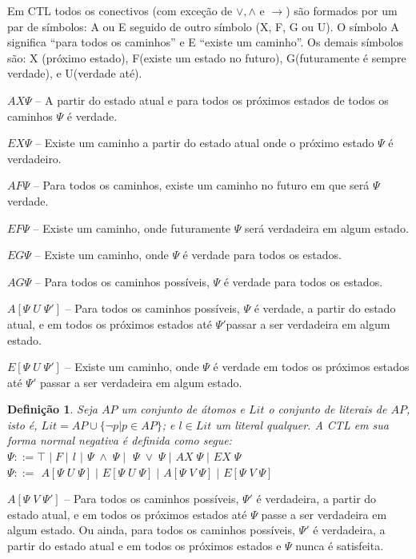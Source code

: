 \documentclass[normaltoc,capchap,capsec,times]{abnt}
\newtheorem{defi}{Definição}[section]
\begin{document}
Em CTL todos os conectivos (com exceção de $\vee,\wedge$ e $\to$) são formados por um par de símbolos: A ou E seguido de outro símbolo (X, F, G ou U). O símbolo A significa ``para todos os caminhos'' e E ``existe um caminho''. Os demais símbolos são: X (próximo estado), F(existe um estado no futuro), G(futuramente é sempre verdade), e U(verdade até).

$AX \Psi $ -- A partir do estado atual e para todos os próximos estados de todos os caminhos $\Psi$ é verdade.

$EX \Psi$ -- Existe um caminho a partir do estado atual onde o próximo estado $\Psi$ é verdadeiro. 

$AF \Psi$ -- Para todos os caminhos, existe um caminho no futuro em que  será $\Psi$ verdade.

$EF \Psi$ -- Existe um caminho, onde futuramente $\Psi$ será verdadeira em algum estado.

$EG \Psi$ -- Existe um caminho, onde $\Psi$ é verdade para todos os estados.

$AG \Psi$ -- Para todos os caminhos possíveis, $\Psi$ é verdade para todos os estados.

$ A[\Psi \;U \;\Psi']$ -- Para todos os caminhos possíveis, $\Psi$ é verdade, a partir do estado atual, e em todos os próximos estados até  $\Psi'$passar a ser verdadeira em algum estado.

$ E[\Psi \;U \;\Psi']$ -- Existe um caminho, onde $\Psi$  é verdade em todos os próximos estados até $\Psi'$  passar a ser verdadeira em algum estado.

\begin{defi}\label{def:ctlnormalnegativa}
\textnormal{Seja $AP$ um conjunto de átomos e $Lit$ o conjunto de literais de $AP$, isto é, $Lit = AP \cup \{\neg p | p \in AP \}$; e $l \in Lit$ um literal qualquer. A CTL em sua forma normal negativa é definida como segue:\\
$\Psi ::= \top \;\vert \; F \;\vert $ $ l $ $\vert$  $ \Psi\; \wedge \;\Psi \;\vert \; $ $ \Psi \;\vee \;\Psi\; \vert $   $ AX \; \Psi \;\vert $ $ EX \; \Psi \;$  \\
$\Psi ::= $ $ A[\Psi \;U \;\Psi]\;\vert $ $ E[\Psi \;U \;\Psi] \;\vert$ $A[\Psi \;V \;\Psi] \; \vert$ $E[\Psi \;V \;\Psi]$
}

\end{defi}

$A[\Psi\; V\; \Psi']$ -- Para todos os caminhos possíveis, $\Psi'$ é verdadeira, a partir do estado atual, e em todos os próximos estados até $\Psi$ passe a ser verdadeira em algum estado. Ou ainda, para todos os caminhos possíveis, $\Psi'$ é verdadeira, a partir do estado atual e em todos os próximos estados e $\Psi$ nunca é satisfeita.
\end{document}
